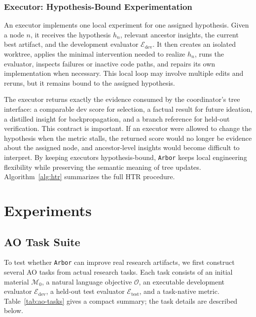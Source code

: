 \documentclass[]{selfevolagent}
\theoremstyle{plain}
\theoremstyle{definition}
\theoremstyle{remark}
\newcommand{\arbor}{\texttt{Arbor}}
\newcommand{\Mat}{\mathcal{M}}
\newcommand{\Obj}{\mathcal{O}}
\newcommand{\Eval}{\mathcal{E}}
\newcommand{\dev}{\mathrm{dev}}
\newcommand{\test}{\mathrm{test}}
\begin{document}
\subsubsection{Executor: Hypothesis-Bound Experimentation}
\label{sec:framework-executor}
An executor implements one local experiment for one assigned hypothesis. Given a node $n$, it receives the hypothesis $h_n$, relevant ancestor insights, the
current best artifact, and the development evaluator $\Eval_{\dev}$. It then
creates an isolated worktree, applies the minimal intervention needed to realize
$h_n$, runs the evaluator, inspects failures or inactive code paths, and repairs
its own implementation when necessary. This local loop may involve multiple
edits and reruns, but it remains bound to the assigned hypothesis.

The executor returns exactly the evidence consumed by the coordinator's tree
interface: a comparable dev score for selection, a factual result for future
ideation, a distilled insight for backpropagation, and a branch reference for
held-out verification. This contract is important. If an executor were allowed
to change the hypothesis when the metric stalls, the returned score would no
longer be evidence about the assigned node, and ancestor-level insights would
become difficult to interpret. By keeping executors hypothesis-bound, \arbor{}
keeps local engineering flexibility while preserving the semantic meaning of
tree updates. Algorithm~\ref{alg:htr} summarizes the full HTR procedure.





\FloatBarrier

\section{Experiments}
\label{sec:experiments}

\subsection{AO Task Suite}
\label{sec:ao-task-suite}

To test whether \arbor{} can improve real research artifacts, we first construct
several AO tasks from actual research tasks. Each task consists of an initial
material $\Mat_0$, a natural language objective $\Obj$, an executable
development evaluator $\Eval_{\dev}$, a held-out test evaluator $\Eval_{\test}$,
and a task-native metric. Table~\ref{tab:ao-tasks} gives a compact summary; the
task details are described below.
\end{document}
